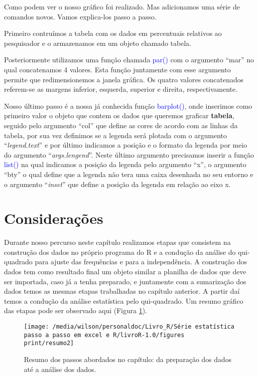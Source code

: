 \documentclass[14pt,titlepage, oneside, openany, a4paper]{book}
\begin{document}
Como podem ver o nosso gráfico foi realizado. Mas adicionamos uma série de comandos novos. Vamos explica-los passo a passo.

Primeiro contruímos a tabela com os dados em percentuais relativos ao pesquisador e o armazenamos em um objeto chamado tabela.

Posteriormente utilizamos uma função chamada \textcolor{blue}{par()} com o argumento ``mar'' no qual concatenamos 4 valores. Esta função juntamente com esse argumento permite que redimensionemos a janela gráfica. Os quatro valores concatenados referem-se as margens inferior, esquerda, superior e direita, respectivamente.

Nosso último passo é a nossa já conhecida função \textcolor{blue}{barplot()}, onde inserimos como primeiro valor o objeto que contem os dados que queremos graficar \textbf{tabela}, seguido pelo argumento ``col'' que define as cores de acordo com as linhas da tabela, por sua vez definimos se a legenda será plotada com o argumento ``\emph{legend.text}'' e por último indicamos a posição e o formato da legenda por meio do argumento ``\emph{args.lengend}''. Neste último argumento precisamos inserir a função \textcolor{blue}{list()} na qual indicamos a posição da legenda pelo argumento ``x'', o argumento ``bty'' o qual define que a legenda não tera uma caixa desenhada no seu entorno e o argumento ``\emph{inset}'' que define a posição da legenda em relação ao eixo x.

\hypertarget{considerauxe7uxf5es-1}{%
\section{Considerações}\label{considerauxe7uxf5es-1}}

Durante nosso percurso neste capítulo realizamos etapas que consistem na construção dos dados no próprio programa do R e a condução da análise do qui-quadrado para ajuste das frequências e para a independência. A construção dos dados tem como resultado final um objeto similar a planilha de dados que deve ser importada, caso já a tenha preparado, e juntamente com a sumarização dos dados temos as mesmas etapas trabalhadas no capítulo anterior. A partir daí temos a condução da análise estatística pelo qui-quadrado. Um resumo gráfico das etapas pode ser observado aqui (Figura \ref{fig:resumo2}).

\begin{figure}[H]

{\centering \texttt{[image: /media/wilson/personaldoc/Livro\_R/Série estatística passo a passo em excel e R/livroR-1.0/figures print/resumo2]} 

}

\caption{Resumo dos passos abordados no capítulo: da preparação dos dados até a análise dos dados.}\label{fig:resumo2}
\end{figure}
\end{document}
